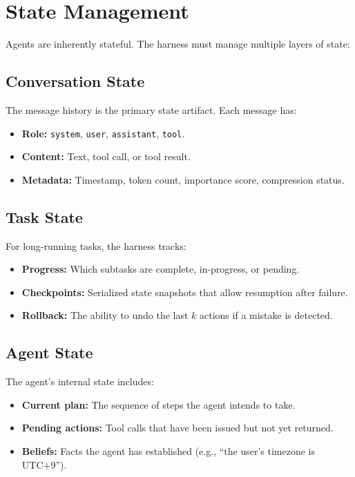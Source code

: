 \section{State Management}
\label{subsec:state-management}

Agents are inherently stateful. The harness must manage multiple layers of state:

\subsection{Conversation State}
\label{conversation-state}

The message history is the primary state artifact. Each message has:

\begin{itemize}
  \item \textbf{Role:} \texttt{system}, \texttt{user}, \texttt{assistant}, \texttt{tool}.
  \item \textbf{Content:} Text, tool call, or tool result.
  \item \textbf{Metadata:} Timestamp, token count, importance score, compression status.
\end{itemize}

\subsection{Task State}
\label{task-state}

For long-running tasks, the harness tracks:

\begin{itemize}
  \item \textbf{Progress:} Which subtasks are complete, in-progress, or pending.
  \item \textbf{Checkpoints:} Serialized state snapshots that allow resumption after failure.
  \item \textbf{Rollback:} The ability to undo the last $k$ actions if a mistake is detected.
\end{itemize}

\subsection{Agent State}
\label{agent-state}

The agent’s internal state includes:

\begin{itemize}
  \item \textbf{Current plan:} The sequence of steps the agent intends to take.
  \item \textbf{Pending actions:} Tool calls that have been issued but not yet returned.
  \item \textbf{Beliefs:} Facts the agent has established (e.g., ``the user’s timezone is UTC+9'').
\end{itemize}

